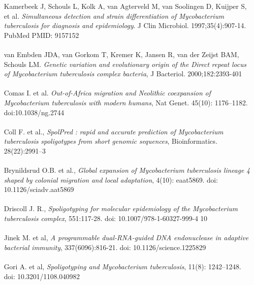 \documentclass[twoside,a4paper,11pt,frenchb,openany]{report}
\begin{document}
\begin{spacing}{0.5}
\begin{thebibliography}{10}
Kamerbeek J, Schouls L, Kolk A, van Agterveld M, van Soolingen D, Kuijper S, et al. \textit{Simultaneous detection and strain differentiation of
Mycobacterium tuberculosis for diagnosis and epidemiology}. J Clin
Microbiol. 1997;35(4):907-14. PubMed PMID: 9157152\\ \\

van Embden JDA, van Gorkom T, Kremer K, Jansen R, van der Zeijst BAM,
Schouls LM. \textit{Genetic variation and evolutionary origin of the Direct
repeat locus of Mycobacterium tuberculosis complex bacteria}, J
Bacteriol. 2000;182:2393-401\\ \\

Comas I. et al. \textit{Out-of-Africa migration and Neolithic coexpansion of Mycobacterium tuberculosis with modern humans}, Nat Genet. 45(10): 1176–1182. doi:10.1038/ng.2744\\ \\

Coll F. et al., \textit{SpolPred : rapid and accurate prediction of Mycobacterium tuberculosis spoligotypes from short genomic sequences}, Bioinformatics. 28(22):2991–3\\ \\

Brynildsrud O.B. et al., \textit{Global expansion of Mycobacterium tuberculosis lineage 4 shaped by colonial migration and local adaptation}, 4(10): eaat5869. doi: 10.1126/sciadv.aat5869\\ \\

Driscoll J. R., \textit{Spoligotyping for molecular epidemiology of the Mycobacterium tuberculosis complex}, 551:117-28. doi: 10.1007/978-1-60327-999-4 10\\ \\

Jinek M. et al, \textit{A programmable dual-RNA-guided DNA endonuclease in adaptive bacterial immunity}, 337(6096):816-21. doi: 10.1126/science.1225829\\ \\

Gori A. et al, \textit{Spoligotyping and Mycobacterium tuberculosis}, 11(8): 1242–1248. doi: 10.3201/1108.040982\\ \\


\end{thebibliography}
\end{spacing}
\end{document}
